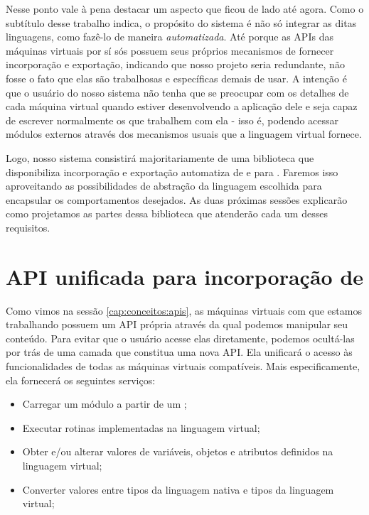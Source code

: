     Nesse ponto vale à pena destacar um aspecto que ficou de lado até agora.
    Como o subtítulo desse trabalho indica, o propósito do sistema é não só
    integrar as ditas linguagens, como fazê-lo de maneira \textit{automatizada}.
    Até porque as APIs das máquinas virtuais por sí sós possuem seus próprios
    mecanismos de fornecer incorporação e exportação, indicando que nosso
    projeto seria redundante, não fosse o fato que elas são trabalhosas e
    específicas demais de usar. A intenção é que o usuário do nosso sistema não
    tenha que se preocupar com os detalhes de cada máquina virtual quando
    estiver desenvolvendo a aplicação dele e seja capaz de escrever normalmente
    os  que trabalhem com ela - isso é, podendo acessar módulos
    externos através dos mecanismos usuais que a linguagem virtual fornece.

    Logo, nosso sistema consistirá majoritariamente de uma biblioteca \CXX{}
    que disponibiliza incorporação e exportação automatiza de e para .
    Faremos isso aproveitando as possibilidades de abstração da linguagem
    escolhida para encapsular os comportamentos desejados. As duas próximas
    sessões explicarão como projetamos as partes dessa biblioteca que atenderão
    cada um desses requisitos.

  \section{API unificada para incorporação de }
  \label{sec:estrutura:opa}

    Como vimos na sessão \ref{cap:conceitos:apis}, as máquinas virtuais com que
    estamos trabalhando possuem um API própria através da qual podemos manipular
    seu conteúdo. Para evitar que o usuário acesse elas diretamente, podemos
    ocultá-las por trás de uma camada que constitua uma nova API. Ela unificará
    o acesso às funcionalidades de todas as máquinas virtuais compatíveis. Mais
    especificamente, ela fornecerá os seguintes serviços:


    \begin{itemize}
      \item Carregar um módulo a partir de um \script{};
      \item Executar rotinas implementadas na linguagem virtual;
      \item Obter e/ou alterar valores de variáveis, objetos e atributos
            definidos na linguagem virtual;
      \item Converter valores entre tipos da linguagem nativa e tipos da
            linguagem virtual;
    \end{itemize}

